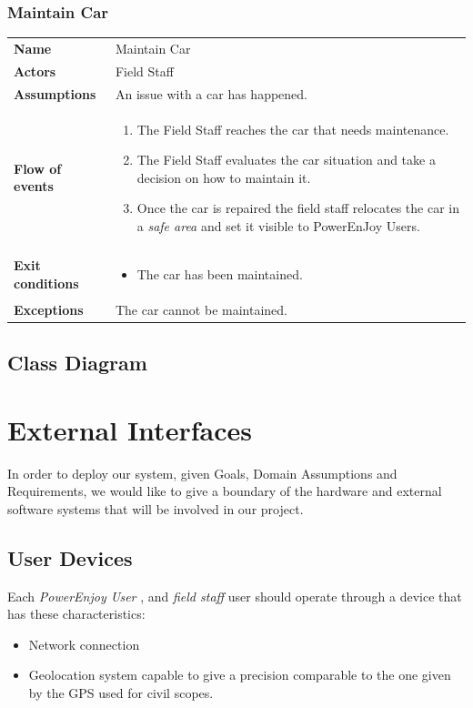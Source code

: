 \documentclass[english]{article}
\newcommand{\powerenjoyuser}{\textit{PowerEnjoy User }}
\newcommand{\safearea}{\textit{safe area }}
\newcommand{\fieldstaff}{\textit{field staff }}
\begin{document}
\subsubsection{Maintain Car}
	\begin{center}
	\begin{tabular}{l||p{10cm}}
	\textbf{Name} 
		&Maintain Car\\ [8px]
	\textbf{Actors} 
		& Field Staff\\ [8px]
	\textbf{Assumptions} 
		&An issue with a car has happened.\\
	\textbf{Flow of events}
		& \begin{enumerate}
			\item The Field Staff reaches the car that needs maintenance.
			\item The Field Staff evaluates the car situation and take a decision on how to maintain it. 
			\item Once the car is repaired the field staff relocates the car in a \safearea and set it visible to PowerEnJoy Users.
		\end{enumerate}\\ 
	\textbf{Exit conditions}
		&\begin{itemize}
			\item The car has been maintained.
		\end{itemize}\\
	\textbf{Exceptions}
		&The car cannot be maintained.\\[8px]
	\end{tabular}
	\end{center}

	\subsection{Class Diagram}
\section{External Interfaces}
In order to deploy our system, given Goals, Domain Assumptions and Requirements, we would like to give a boundary of the hardware and external software systems that will be involved in our project.
\subsection{User Devices}
	Each \powerenjoyuser, and \fieldstaff user should operate through a device that has these characteristics:
		\begin{itemize}
			\item Network connection
			\item Geolocation system capable to give a precision comparable to the one given by the GPS used for civil scopes.
		\end{itemize}
\end{document}
